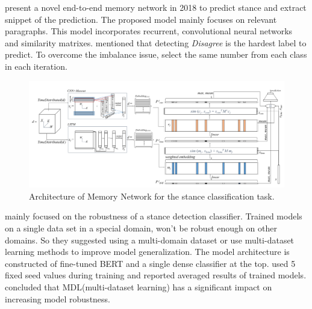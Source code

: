 \cite{memory_network} present a novel end-to-end memory network in 2018 to predict stance and extract snippet of the prediction. The proposed model mainly focuses on relevant paragraphs. This model incorporates recurrent, convolutional neural networks and similarity matrixes. \cite{memory_network} mentioned that detecting \textit{Disagree} is the hardest label to predict. To overcome the imbalance issue, \cite{memory_network} select the same number from each class in each iteration. 
\begin{figure}
	\centering
	\includegraphics[scale=0.25]{statistics/stance/memoty_network.png}
	\caption{Architecture of Memory Network for the stance classification task.}
	\label{fig:mem_network}
\end{figure}

\cite{stance_robust} mainly focused on the robustness of a stance detection classifier. Trained models  on a single data set in a special domain, won't be robust enough on other domains. So they suggested using a multi-domain dataset or use multi-dataset learning methods to improve model generalization. The model architecture is constructed of fine-tuned BERT\cite{bert} and a single dense classifier at the top. \cite{stance_robust} used 5 fixed seed values during training and reported averaged results of trained models. \cite{stance_robust} concluded that MDL(multi-dataset learning) has a significant impact on increasing model robustness.
